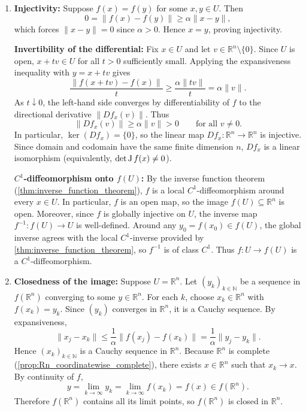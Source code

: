 \begin{exercisesolution}
\label{sol:expansive_local_diffeomorphism_global_inverse}
\begin{enumerate}[label=\textbf{(\alph*)}]
  \item \textbf{Injectivity:} Suppose $f(x) = f(y)$ for some $x, y \in U$. Then
    \[0 = \|f(x) - f(y)\| \geq \alpha \|x - y\|,\]
    which forces $\|x - y\| = 0$ since $\alpha > 0$. Hence $x = y$, proving injectivity.

    \textbf{Invertibility of the differential:} Fix $x \in U$ and let $v \in \mathbb{R}^n \setminus \{0\}$.
    Since $U$ is open, $x + tv \in U$ for all $t > 0$ sufficiently small. Applying the expansiveness
    inequality with $y = x + tv$ gives
    \[\frac{\|f(x + tv) - f(x)\|}{t} \geq \frac{\alpha \|tv\|}{t} = \alpha \|v\|.\]
    As $t \downarrow 0$, the left-hand side converges by differentiability of $f$ to the directional
    derivative $\|Df_x(v)\|$. Thus
    \[\|Df_x(v)\| \geq \alpha \|v\| > 0 \qquad \text{for all } v \neq 0.\]
    In particular, $\ker(Df_x) = \{0\}$, so the linear map $Df_x : \mathbb{R}^n \to \mathbb{R}^n$ is
    injective. Since domain and codomain have the same finite dimension $n$, $Df_x$ is a linear
    isomorphism (equivalently, $\det \operatorname{J} f(x) \neq 0$).

    \textbf{$C^1$-diffeomorphism onto $f(U)$:} By the inverse function theorem
    (\cref{thm:inverse_function_theorem}), $f$ is a local $C^1$-diffeomorphism around every $x \in U$.
    In particular, $f$ is an open map, so the image $f(U) \subseteq \mathbb{R}^n$ is open.
    Moreover, since $f$ is globally injective on $U$, the inverse map $f^{-1} : f(U) \to U$ is well-defined.
    Around any $y_0 = f(x_0) \in f(U)$, the global inverse agrees with the local $C^1$-inverse provided
    by \cref{thm:inverse_function_theorem}, so $f^{-1}$ is of class $C^1$. Thus $f : U \to f(U)$ is a
    $C^1$-diffeomorphism.

  \item \textbf{Closedness of the image:} Suppose $U = \mathbb{R}^n$. Let $(y_k)_{k \in \mathbb{N}}$ be
    a sequence in $f(\mathbb{R}^n)$ converging to some $y \in \mathbb{R}^n$. For each $k$, choose
    $x_k \in \mathbb{R}^n$ with $f(x_k) = y_k$.
    Since $(y_k)$ converges in $\mathbb{R}^n$, it is a Cauchy sequence. By expansiveness,
    \[\|x_j - x_k\| \leq \frac{1}{\alpha} \|f(x_j) - f(x_k)\| = \frac{1}{\alpha} \|y_j - y_k\|.\]
    Hence $(x_k)_{k \in \mathbb{N}}$ is a Cauchy sequence in $\mathbb{R}^n$. Because $\mathbb{R}^n$ is
    complete (\cref{prop:Rn_coordinatewise_complete}), there exists $x \in \mathbb{R}^n$ such that $x_k \to x$.
    By continuity of $f$,
    \[y = \lim_{k \to \infty} y_k = \lim_{k \to \infty} f(x_k) = f(x) \in f(\mathbb{R}^n).\]
    Therefore $f(\mathbb{R}^n)$ contains all its limit points, so $f(\mathbb{R}^n)$ is closed in $\mathbb{R}^n$.


\end{enumerate}
\end{exercisesolution}
